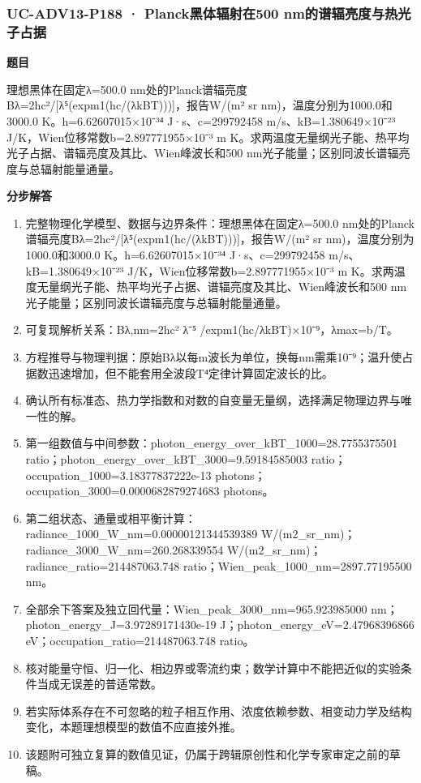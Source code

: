 \documentclass[UTF8,11pt,a4paper]{ctexart}
\begin{document}
\subsubsection*{UC-ADV13-P188 · Planck黑体辐射在500 nm的谱辐亮度与热光子占据}
\noindent\textbf{题目}\par
理想黑体在固定λ=500.0 nm处的Planck谱辐亮度Bλ=2hc²/[λ⁵(expm1(hc/(λkBT)))]，报告W/(m² sr nm)，温度分别为1000.0和3000.0 K。h=6.62607015×10⁻³⁴ J·s、c=299792458 m/s、kB=1.380649×10⁻²³ J/K，Wien位移常数b=2.897771955×10⁻³ m K。求两温度无量纲光子能、热平均光子占据、谱辐亮度及其比、Wien峰波长和500 nm光子能量；区别同波长谱辐亮度与总辐射能量通量。\par
\medskip\noindent\textbf{分步解答}
\begin{enumerate}
\item 完整物理化学模型、数据与边界条件：理想黑体在固定λ=500.0 nm处的Planck谱辐亮度Bλ=2hc²/[λ⁵(expm1(hc/(λkBT)))]，报告W/(m² sr nm)，温度分别为1000.0和3000.0 K。h=6.62607015×10⁻³⁴ J·s、c=299792458 m/s、kB=1.380649×10⁻²³ J/K，Wien位移常数b=2.897771955×10⁻³ m K。求两温度无量纲光子能、热平均光子占据、谱辐亮度及其比、Wien峰波长和500 nm光子能量；区别同波长谱辐亮度与总辐射能量通量。
\item 可复现解析关系：Bλ,nm=2hc² λ⁻⁵ /expm1(hc/λkBT)×10⁻⁹，λmax=b/T。
\item 方程推导与物理判据：原始Bλ以每m波长为单位，换每nm需乘10⁻⁹；温升使占据数迅速增加，但不能套用全波段T⁴定律计算固定波长的比。
\item 确认所有标准态、热力学指数和对数的自变量无量纲，选择满足物理边界与唯一性的解。
\item 第一组数值与中间参数：photon\_energy\_over\_kBT\_1000=28.7755375501 ratio；photon\_energy\_over\_kBT\_3000=9.59184585003 ratio；occupation\_1000=3.18377837222e-13 photons；occupation\_3000=0.0000682879274683 photons。
\item 第二组状态、通量或相平衡计算：radiance\_1000\_W\_nm=0.00000121344539389 W/(m2\_sr\_nm)；radiance\_3000\_W\_nm=260.268339554 W/(m2\_sr\_nm)；radiance\_ratio=214487063.748 ratio；Wien\_peak\_1000\_nm=2897.77195500 nm。
\item 全部余下答案及独立回代量：Wien\_peak\_3000\_nm=965.923985000 nm；photon\_energy\_J=3.97289171430e-19 J；photon\_energy\_eV=2.47968396866 eV；occupation\_ratio=214487063.748 ratio。
\item 核对能量守恒、归一化、相边界或零流约束；数学计算中不能把近似的实验条件当成无误差的普适常数。
\item 若实际体系存在不可忽略的粒子相互作用、浓度依赖参数、相变动力学及结构变化，本题理想模型的数值不应直接外推。
\item 该题附可独立复算的数值见证，仍属于跨辑原创性和化学专家审定之前的草稿。
\end{enumerate}
\end{document}
